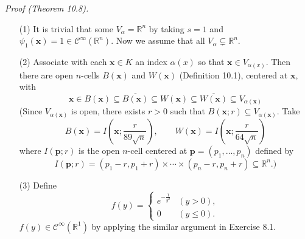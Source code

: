 \documentclass{article}
\begin{document}
\emph{Proof (Theorem 10.8).}
\begin{enumerate}
\item[(1)]
  It is trivial that some $V_{\alpha} = \mathbb{R}^n$
  by taking $s = 1$ and $\psi_1(\mathbf{x}) = 1 \in \mathscr{C}^{\infty}(\mathbb{R}^n)$.
  Now we assume that all $V_{\alpha} \subsetneq \mathbb{R}^n$.

\item[(2)]
  Associate with each $\mathbf{x} \in K$ an index $\alpha(x)$ so that $\mathbf{x} \in V_{\alpha(x)}$.
  Then there are open $n$-cells $B(\mathbf{x})$ and $W(\mathbf{x})$ (Definition 10.1),
  centered at $\mathbf{x}$,
  with
  \[
    \mathbf{x}
    \in B(\mathbf{x})
    \subseteq \overline{B(\mathbf{x})}
    \subseteq W(\mathbf{x})
    \subseteq \overline{W(\mathbf{x})}
    \subseteq V_{\alpha(\mathbf{x})}
  \]
  (Since $V_{\alpha(\mathbf{x})}$ is open, there exists $r > 0$
  such that $B(\mathbf{x};r) \subseteq V_{\alpha(\mathbf{x})}$.
  Take
  \[
    B(\mathbf{x}) = I\left(\mathbf{x};\frac{r}{89\sqrt{n}}\right),
    \qquad
    W(\mathbf{x}) = I\left(\mathbf{x};\frac{r}{64\sqrt{n}}\right)
  \]
  where $I(\mathbf{p};r)$ is the open $n$-cell centered at $\mathbf{p} = (p_1,\ldots,p_n)$
  defined by
  \[
    I(\mathbf{p};r)
    = (p_1-r,p_1+r) \times \cdots \times (p_n-r,p_n+r) \subseteq \mathbb{R}^n.)
  \]

\item[(3)]
  Define
  \begin{equation*}
    f(y) =
    \begin{cases}
      e^{-\frac{1}{y^2}} & (y > 0), \\
      0 & (y \leq 0).
    \end{cases}
  \end{equation*}
  $f(y) \in \mathscr{C}^{\infty}(\mathbb{R}^1)$
  by applying the similar argument in Exercise 8.1.


\end{enumerate}
\end{document}
